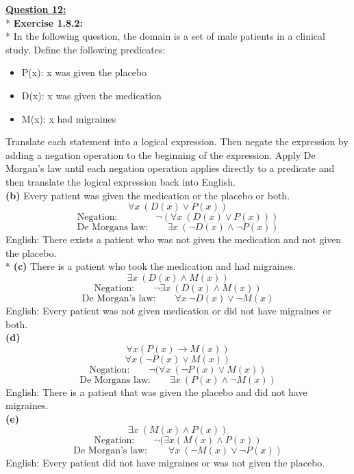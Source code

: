 \documentclass[12pt, letterpaper, twoside]{article}
\begin{document}
\newpage
\noindent \underline{\textbf{Question 12:}}\\*
\break
\textbf{Exercise 1.8.2:}\\*
In the following question, the domain is a set of male patients in a clinical study. Define the following predicates:\\
\begin{itemize}[noitemsep,topsep=0pt]
\item P(x): x was given the placebo
\item D(x): x was given the medication
\item M(x): x had migraines\\
\end{itemize}
Translate each statement into a logical expression. Then negate the expression by adding a negation operation to the beginning of the expression. Apply De Morgan's law until each negation operation applies directly to a predicate and then translate the logical expression back into English.\\
\break
\normalsize
\noindent \textbf{(b)} Every patient was given the medication or the placebo or both.\\
\break
\[ \forall x\ (D(x) \lor P(x))   \]
\[ \text{Negation:}  \qquad\qquad \neg(\forall x\ (D(x) \lor P(x)))   \]
\[ \text{De Morgans law:} \qquad \exists x\ ( \neg{D}(x) \land \neg{P}(x))\]
English: There exists a patient who was not given the medication and not given the placebo.\\*
\break
\noindent \textbf{(c)} There is a patient who took the medication and had migraines.
\[ \exists x\ (D(x) \land M(x))   \]
\[ \text{Negation:} \qquad   \neg{\exists} x\ (D(x) \land M(x))   \]
\[ \text{De Morgan’s law:} \qquad   \forall x\ \neg{D}(x) \lor \neg{M}(x)   \]
English: Every patient was not given medication or did not have migraines or both.\\
\break
\break
\noindent \textbf{(d)}
\[ \forall x (P(x) \to M(x))   \]
\[ \forall x (\neg{P}(x) \lor M(x))   \]
\[ \text{Negation:} \qquad   \neg{(} \forall x\ (\neg{P}(x) \lor M(x))   \]
\[ \text{De Morgans law:} \qquad   \exists x\ (P(x) \land \neg{M}(x))   \]
English: There is a patient that was given the placebo and did not have migraines.\\
\newpage
\noindent \textbf{(e)}
\[ \exists x\ (M(x) \land P(x))   \]
\[ \text{Negation:} \qquad \neg{(} \exists x (M(x) \land P(x))   \]
\[ \text{De Morgan’s law:} \qquad\ \forall x\ (\neg{M}(x) \lor \neg{P}(x))   \]
English: Every patient did not have migraines or was not given the placebo.
\break
\break
\end{document}
